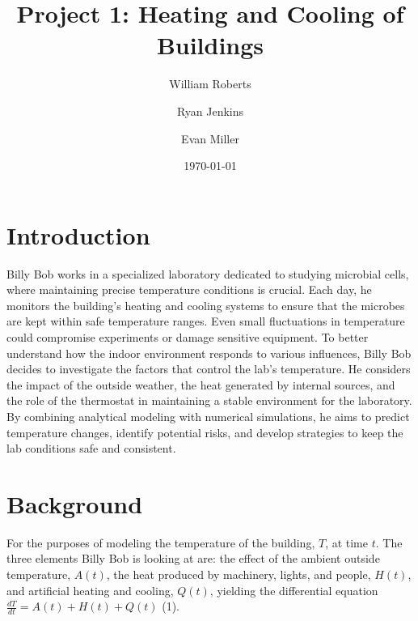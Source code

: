 \documentclass[12pt]{article}
\title{Project 1: Heating and Cooling of Buildings}
\author{William Roberts \and Ryan Jenkins \and Evan Miller}
\date{\today}
\begin{document}
\maketitle

\tableofcontents
\clearpage

\section{Introduction}
Billy Bob works in a specialized laboratory dedicated to studying microbial cells, where maintaining precise temperature conditions is crucial. Each day, he monitors the building’s heating and cooling systems to ensure that the microbes are kept within safe temperature ranges. Even small fluctuations in temperature could compromise experiments or damage sensitive equipment. To better understand how the indoor environment responds to various influences, Billy Bob decides to investigate the factors that control the lab's temperature. He considers the impact of the outside weather, the heat generated by internal sources, and the role of the thermostat in maintaining a stable environment for the laboratory. By combining analytical modeling with numerical simulations, he aims to predict temperature changes, identify potential risks, and develop strategies to keep the lab conditions safe and consistent.

\section{Background}
For the purposes of modeling the temperature of the building, $T$, at time $t$. The three elements Billy Bob is looking at are: the effect of the ambient outside temperature, $A(t)$, the heat produced by machinery, lights, and people, $H(t)$, and artificial heating and cooling, $Q(t)$, yielding the differential equation $ \frac{dT}{dt} = A(t) + H(t) + Q(t)$ (1).
\end{document}
